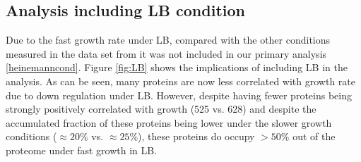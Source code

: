 \subsection{Analysis including LB condition}
Due to the fast growth rate under LB, compared with the other conditions measured in the data set from \cite{Heinemann2015} it was not included in our primary analysis \ref{heinemanncond}.
Figure \ref{fig:LB} shows the implications of including LB in the analysis.
As can be seen, many proteins are now less correlated with growth rate due to down regulation under LB.
However, despite having fewer proteins being strongly positively correlated with growth (525 vs. 628) and despite the accumulated fraction of these proteins being lower under the slower growth conditions ($\approx20\%$ vs. $\approx25\%$), these proteins do occupy $>50\%$ out of the proteome under fast growth in LB.
